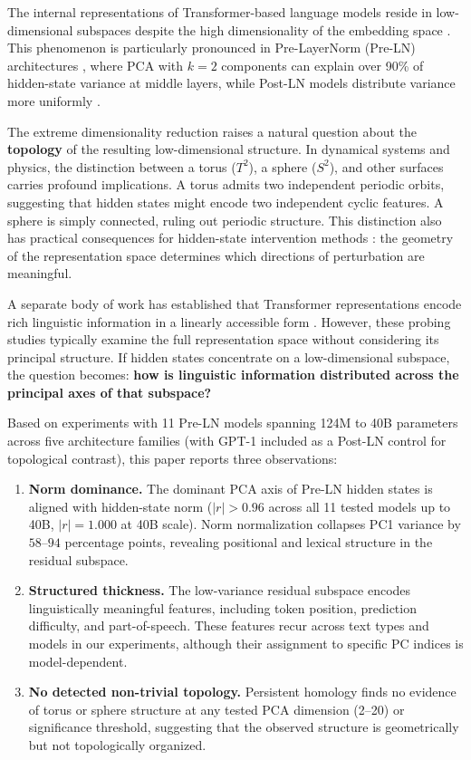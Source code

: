 \documentclass[11pt,a4paper]{article}
\begin{document}
The internal representations of Transformer-based language models reside in low-dimensional subspaces despite the high dimensionality of the embedding space \citep{aghajanyan2021intrinsic}. This phenomenon is particularly pronounced in Pre-LayerNorm (Pre-LN) architectures \citep{xiong2020layer}, where PCA with $k = 2$ components can explain over 90\% of hidden-state variance at middle layers, while Post-LN models distribute variance more uniformly \citep{ethayarajh2019contextual}.

The extreme dimensionality reduction raises a natural question about the \textbf{topology} of the resulting low-dimensional structure. In dynamical systems and physics, the distinction between a torus ($T^2$), a sphere ($S^2$), and other surfaces carries profound implications. A torus admits two independent periodic orbits, suggesting that hidden states might encode two independent cyclic features. A sphere is simply connected, ruling out periodic structure. This distinction also has practical consequences for hidden-state intervention methods \citep{li2024inference,turner2024activation}: the geometry of the representation space determines which directions of perturbation are meaningful.

A separate body of work has established that Transformer representations encode rich linguistic information in a linearly accessible form \citep{alain2017understanding,hewitt2019structural,tenney2019bert}. However, these probing studies typically examine the full representation space without considering its principal structure. If hidden states concentrate on a low-dimensional subspace, the question becomes: \textbf{how is linguistic information distributed across the principal axes of that subspace?}

Based on experiments with 11 Pre-LN models spanning 124M to 40B parameters across five architecture families (with GPT-1 included as a Post-LN control for topological contrast), this paper reports three observations:

\begin{enumerate}
    \item \textbf{Norm dominance.} The dominant PCA axis of Pre-LN hidden states is aligned with hidden-state norm ($|r| > 0.96$ across all 11 tested models up to 40B, $|r| = 1.000$ at 40B scale). Norm normalization collapses PC1 variance by $58$--$94$ percentage points, revealing positional and lexical structure in the residual subspace.

    \item \textbf{Structured thickness.} The low-variance residual subspace encodes linguistically meaningful features, including token position, prediction difficulty, and part-of-speech. These features recur across text types and models in our experiments, although their assignment to specific PC indices is model-dependent.

    \item \textbf{No detected non-trivial topology.} Persistent homology finds no evidence of torus or sphere structure at any tested PCA dimension (2--20) or significance threshold, suggesting that the observed structure is geometrically but not topologically organized.
\end{enumerate}
\end{document}
